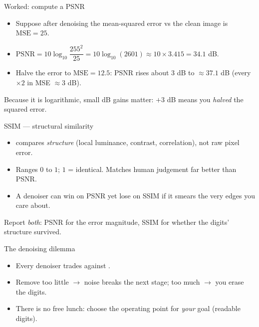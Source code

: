 \documentclass[10pt,aspectratio=169]{beamer}
\begin{document}
\begin{frame}{Worked: compute a PSNR}
  \begin{itemize}
    \item Suppose after denoising the mean-squared error vs the clean image is $\mathrm{MSE}=25$.
    \item $\mathrm{PSNR}=10\log_{10}\dfrac{255^2}{25}=10\log_{10}(2601)\approx 10\times3.415=\mathbf{34.1}$ dB.
    \item Halve the error to $\mathrm{MSE}=12.5$: PSNR rises about $3$ dB to $\approx 37.1$ dB (every $\times2$ in MSE $\approx 3$ dB).
  \end{itemize}
  \begin{infobox}
    Because it is logarithmic, small dB gains matter: $+3$ dB means you \emph{halved} the squared error.
  \end{infobox}
\end{frame}

\begin{frame}{SSIM — structural similarity}
  \begin{itemize}
    \item {} compares \emph{structure} (local luminance, contrast, correlation), not raw pixel error.
    \item Ranges $0$ to $1$; $1$ = identical. Matches human judgement far better than PSNR.
    \item A denoiser can win on PSNR yet lose on SSIM if it smears the very edges you care about.
  \end{itemize}
  \begin{goodbox}
    Report \emph{both}: PSNR for the error magnitude, SSIM for whether the digits' structure survived.
  \end{goodbox}
\end{frame}

\begin{frame}{The denoising dilemma}
  \begin{itemize}
    \item Every denoiser trades  against .
    \item Remove too little $\rightarrow$ noise breaks the next stage; too much $\rightarrow$ you erase the digits.
    \item There is no free lunch: choose the operating point for \emph{your} goal (readable digits).
  \end{itemize}
\end{frame}
\end{document}
